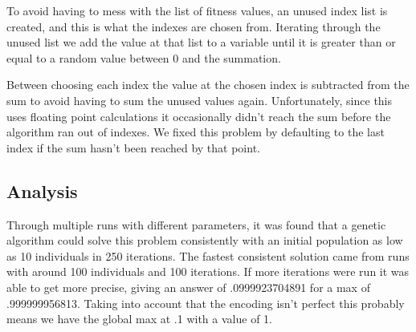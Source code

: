 To avoid having to mess with the list of fitness values, an unused index list is created, and this is what the indexes are chosen from. Iterating through the unused list we add the value at that list to a variable until it is greater than or equal to a random value between 0 and the summation.

Between choosing each index the value at the chosen index is subtracted from the sum to avoid having to sum the unused values again. Unfortunately, since this uses floating point calculations it occasionally didn't reach the sum before the algorithm ran out of indexes. We fixed this problem by defaulting to the last index if the sum hasn't been reached by that point.

\subsection{Analysis}
Through multiple runs with different parameters, it was found that a genetic algorithm could solve this problem consistently with an initial population as low as 10 individuals in 250 iterations. The fastest consistent solution came from runs with around 100 individuals and 100 iterations. If more iterations were run it was able to get more precise, giving an answer of .0999923704891 for a max of .999999956813. Taking into account that the encoding isn't perfect this probably means we have the global max at .1 with a value of 1.


\newpage
